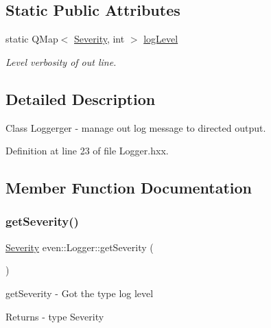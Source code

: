 \subsection*{Static Public Attributes}
\begin{DoxyCompactItemize}
\item 
static Q\+Map$<$ \mbox{\hyperlink{classeven_1_1_logger_adac430b7650d87ac25ace824917d66cf}{Severity}}, int $>$ \mbox{\hyperlink{classeven_1_1_logger_aefbda568413248ac5d03fe072f30eea2}{log\+Level}}
\begin{DoxyCompactList}\small\item\em Level verbosity of out line. \end{DoxyCompactList}\end{DoxyCompactItemize}


\subsection{Detailed Description}
Class Loggerger -\/ manage out log message to directed output. 

Definition at line 23 of file Logger.\+hxx.



\subsection{Member Function Documentation}
\mbox{\label{classeven_1_1_logger_a8aa6bfc4490b9cff931d5d809f146136}} 
\subsubsection{\texorpdfstring{get\+Severity()}{getSeverity()}}
{\footnotesize\ttfamily \mbox{\hyperlink{classeven_1_1_logger_adac430b7650d87ac25ace824917d66cf}{Severity}} even\+::\+Logger\+::get\+Severity (\begin{DoxyParamCaption}{ }\end{DoxyParamCaption})\hspace{0.3cm}{\ttfamily [inline]}}



get\+Severity -\/ Got the type log level 

\begin{DoxyReturn}{Returns}
-\/ type Severity 
\end{DoxyReturn}


